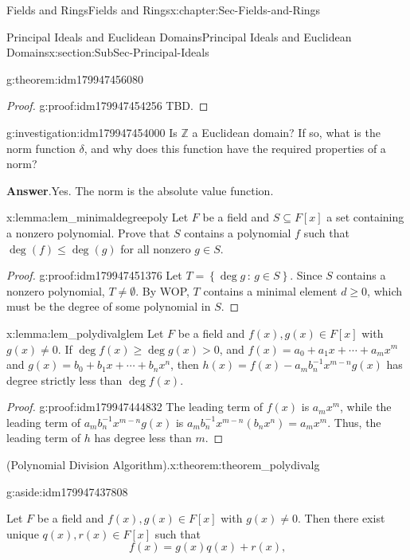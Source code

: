 \documentclass[oneside,10pt,]{book}
\newcommand{\blocktitlefont}{\relax}
\numberwithin{equation}{section}
\renewcommand{\le}{\leqslant}
\renewcommand{\ge}{\geqslant}
\newcommand{\setof}[2]{{\left\{#1\,\colon\,#2\right\}}}
\def\Z{{\mathbb Z}}
\begin{document}
\begin{chapterptx}{Fields and Rings}{}{Fields and Rings}{}{}{x:chapter:Sec-Fields-and-Rings}
\begin{sectionptx}{Principal Ideals and Euclidean Domains}{}{Principal Ideals and Euclidean Domains}{}{}{x:section:SubSec-Principal-Ideals}
\begin{theorem}{}{}{g:theorem:idm179947456080}
\end{theorem}
\begin{proof}{}{g:proof:idm179947454256}
TBD.\end{proof}
\begin{investigation}{}{g:investigation:idm179947454000}%
Is \(\Z\) a Euclidean domain? If so, what is the norm function \(\delta\), and why does this function have the required properties of a norm?%
\par\smallskip%
\noindent\textbf{\blocktitlefont Answer}.\hypertarget{g:answer:idm179947452544}{}\quad{}Yes. The norm is the absolute value function.%
\end{investigation}
\begin{lemma}{}{}{x:lemma:lem_minimaldegreepoly}%
Let \(F\) be a field and \(S\subseteq F[x]\) a set containing a nonzero polynomial. Prove that \(S\) contains a polynomial \(f\) such that \(\deg(f) \le \deg(g)\) for all nonzero \(g\in S\).%
\end{lemma}
\begin{proof}{}{g:proof:idm179947451376}
Let \(T = \setof{\deg g}{g\in S}\). Since \(S\) contains a nonzero polynomial, \(T\ne \emptyset\). By WOP, \(T\) contains a minimal element \(d \ge 0\), which must be the degree of some polynomial in \(S\).%
\end{proof}
\begin{lemma}{}{}{x:lemma:lem_polydivalglem}%
Let \(F\) be a field and \(f(x),g(x)\in F[x]\) with \(g(x)\ne 0\). If \(\deg f(x) \ge \deg g(x) > 0\), and \(f(x) = a_0 + a_1 x + \cdots + a_m x^m\) and \(g(x) = b_0 + b_1 x + \cdots + b_n x^n\), then \(h(x) = f(x) - a_m b_n^{-1} x^{m-n} g(x)\) has degree strictly less than \(\deg f(x)\).%
\end{lemma}
\begin{proof}{}{g:proof:idm179947444832}
The leading term of \(f(x)\) is \(a_m x^m\), while the leading term of \(a_m b_n^{-1} x^{m-n} g(x)\) is \(a_m b_n^{-1} x^{m-n} (b_n x^n) = a_m x^m\). Thus, the leading term of \(h\) has degree less than \(m\).%
\end{proof}
\begin{theorem}{(Polynomial Division Algorithm).}{}{x:theorem:theorem_polydivalg}%
\begin{aside}{}{g:aside:idm179947437808}%
\end{aside}
Let \(F\) be a field and \(f(x),g(x)\in F[x]\) with \(g(x)\ne 0\). Then there exist unique \(q(x),
r(x) \in F[x]\) such that%
\begin{equation*}
f(x) = g(x) q(x) + r(x)\text{,}

\end{equation*}
\end{theorem}
\end{sectionptx}
\end{chapterptx}
\end{document}
